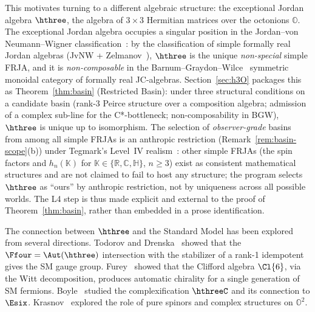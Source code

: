 This motivates turning to a different algebraic structure: the exceptional
Jordan algebra $\hthree$, the algebra of $3 \times 3$ Hermitian matrices
over the octonions $\mathbb{O}$. The exceptional Jordan algebra occupies a
singular position in the Jordan--von Neumann--Wigner
classification~\cite{JvNW1934}: by the classification of simple formally real
Jordan algebras (JvNW + Zelmanov~\cite{Zelmanov1979}), $\hthree$ is the
unique \emph{non-special} simple FRJA, and it is \emph{non-composable}
in the Barnum--Graydon--Wilce~\cite{BGW2020} symmetric monoidal category
of formally real JC-algebras.  Section~\ref{sec:h3O} packages this as
Theorem~\ref{thm:basin} (Restricted Basin): under three structural
conditions on a candidate basin (rank-3 Peirce structure over a
composition algebra; admission of a complex sub-line for the
C*-bottleneck; non-composability in BGW), $\hthree$ is unique up to
isomorphism.  The selection of \emph{observer-grade} basins from among
all simple FRJAs is an anthropic restriction
(Remark~\ref{rem:basin-scope}(b)) under Tegmark's Level~IV
realism~\cite{Tegmark2008}: other simple FRJAs (the spin factors and
$h_n(\mathbb{K})$ for $\mathbb{K}\in\{\mathbb{R},\mathbb{C},\mathbb{H}\}$,
$n\geq 3$) exist as consistent mathematical structures and are not
claimed to fail to host any structure; the program selects $\hthree$
as ``ours'' by anthropic restriction, not by uniqueness across all
possible worlds.  The L4 step is thus made explicit and external to
the proof of Theorem~\ref{thm:basin}, rather than embedded in a prose
identification.~\cite{Albert1934, Baez2002}

The connection between $\hthree$ and the Standard Model has been explored
from several directions. Todorov and Drenska~\cite{TodorovDrenska2018}
showed that the $\Ffour = \Aut(\hthree)$ intersection with the stabilizer
of a rank-1 idempotent gives the SM gauge group. Furey~\cite{Furey2018}
showed that the Clifford algebra $\Cl{6}$, via the Witt decomposition,
produces automatic chirality for a single generation of SM fermions.
Boyle~\cite{Boyle2020} studied the complexification $\hthreeC$ and its
connection to $\Esix$. Krasnov~\cite{Krasnov2025} explored the role of pure
spinors and complex structures on $\mathbb{O}^2$.

